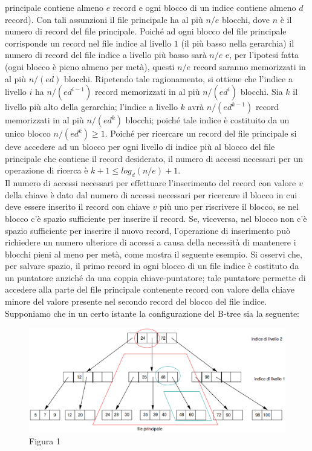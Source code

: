 principale contiene almeno $e$ record e ogni blocco di un indice contiene almeno $d$ record). Con tali
assunzioni il file principale ha al più $n/e$ blocchi, dove $n$ è il numero di record del file principale.
Poiché ad ogni blocco del file principale corrisponde un record nel file indice al livello $1$ (il più
basso nella gerarchia) il numero di record del file indice a livello più basso sarà $n/e$ e, per l'ipotesi
fatta (ogni blocco è pieno almeno per metà), questi $n/e$ record saranno memorizzati in al più $n/(ed)$
blocchi. Ripetendo tale ragionamento, si ottiene che l'indice a livello $i$ ha $n/(ed^{i-1})$ record
memorizzati in al più $n/(ed^i)$ blocchi. Sia $k$ il livello più alto della gerarchia; l'indice a livello
$k$ avrà $n/(ed^{k- 1})$ record memorizzati in al più $n/(ed^k)$ blocchi; poiché tale indice è costituito 
da un unico blocco $n/(ed^k)\geq 1$. Poiché per ricercare un record del file principale si deve accedere 
ad un blocco per ogni livello di indice più al blocco del file principale che contiene il record 
desiderato, il numero di accessi necessari per un operazione di ricerca è $k +1 \leq log_d(n/e)+1$.\\
Il numero di accessi necessari per effettuare l'inserimento del record con valore $v$ della chiave è
dato dal numero di accessi necessari per ricercare il blocco in cui deve essere inserito il record con
chiave $v$ più uno per riscrivere il blocco, se nel blocco c'è spazio sufficiente per inserire il record.
Se, viceversa, nel blocco non c'è spazio sufficiente per inserire il nuovo record, l'operazione di
inserimento può richiedere un numero ulteriore di accessi a causa della necessità di mantenere i
blocchi pieni al meno per metà, come mostra il seguente esempio. Si osservi che, per salvare spazio,
il primo record in ogni blocco di un file indice è costituto da un puntatore anziché da una coppia
chiave-puntatore; tale puntatore permette di accedere alla parte del file principale contenente record
con valore della chiave minore del valore presente nel secondo record del blocco del file indice.
Supponiamo che in un certo istante la configurazione del B-tree sia la seguente:
\begin{figure}[h!]
  \centering
  \includegraphics[width=430px]{immagini-eps/img_5_3_4(1).eps}
  Figura 1
\end{figure}

